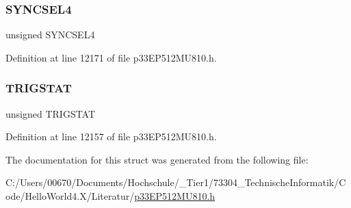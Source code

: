 \mbox{\label{structtag_o_c15_c_o_n2_b_i_t_s_a0cd5bbe196c7974953909d27a6307bb7}} 
\subsubsection{\texorpdfstring{S\+Y\+N\+C\+S\+E\+L4}{SYNCSEL4}}
{\footnotesize\ttfamily unsigned S\+Y\+N\+C\+S\+E\+L4}



Definition at line 12171 of file p33\+E\+P512\+M\+U810.\+h.

\mbox{\label{structtag_o_c15_c_o_n2_b_i_t_s_ab379549de54ac93ad4aa73686c34cb7c}} 
\subsubsection{\texorpdfstring{T\+R\+I\+G\+S\+T\+AT}{TRIGSTAT}}
{\footnotesize\ttfamily unsigned T\+R\+I\+G\+S\+T\+AT}



Definition at line 12157 of file p33\+E\+P512\+M\+U810.\+h.



The documentation for this struct was generated from the following file\+:\begin{DoxyCompactItemize}
\item 
C\+:/\+Users/00670/\+Documents/\+Hochschule/\+\_\+\+Tier1/73304\+\_\+\+Technische\+Informatik/\+Code/\+Hello\+World4.\+X/\+Literatur/\hyperlink{p33_e_p512_m_u810_8h}{p33\+E\+P512\+M\+U810.\+h}\end{DoxyCompactItemize}
